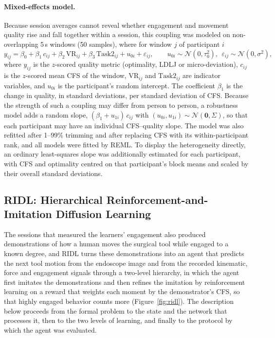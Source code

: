 \documentclass[utf8]{frontiers_suppmat}
\begin{document}
\paragraph*{Mixed-effects model.} Because session averages cannot reveal whether engagement and movement quality rise and fall together within a session, this coupling was modeled on non-overlapping 5\,s windows (50 samples), where for window $j$ of participant $i$
\begin{equation}\label{eq:lmm}
y_{ij}=\beta_0+\beta_1\,c_{ij}+\beta_2\,\mathrm{VR}_{ij}+\beta_3\,\mathrm{Task2}_{ij}+u_{0i}+\varepsilon_{ij},\qquad u_{0i}\sim\mathcal N(0,\tau_0^2),\ \ \varepsilon_{ij}\sim\mathcal N(0,\sigma^2),
\end{equation}
where $y_{ij}$ is the $z$-scored quality metric (optimality, LDLJ or micro-deviation), $c_{ij}$ is the $z$-scored mean CFS of the window, $\mathrm{VR}_{ij}$ and $\mathrm{Task2}_{ij}$ are indicator variables, and $u_{0i}$ is the participant's random intercept. The coefficient $\beta_1$ is the change in quality, in standard deviations, per standard deviation of CFS. Because the strength of such a coupling may differ from person to person, a robustness model adds a random slope, $(\beta_1+u_{1i})\,c_{ij}$ with $(u_{0i},u_{1i})\sim\mathcal N(\mathbf 0,\Sigma)$, so that each participant may have an individual CFS--quality slope. The model was also refitted after 1--99\% trimming and after replacing CFS with its within-participant rank, and all models were fitted by REML. To display the heterogeneity directly, an ordinary least-squares slope was additionally estimated for each participant, with CFS and optimality centred on that participant's block means and scaled by their overall standard deviations.

\subsection{RIDL: Hierarchical Reinforcement-and-Imitation Diffusion Learning}
The sessions that measured the learners' engagement also produced demonstrations of how a human moves the surgical tool while engaged to a known degree, and RIDL turns these demonstrations into an agent that predicts the next tool motion from the endoscope image and from the recorded kinematic, force and engagement signals through a two-level hierarchy, in which the agent first imitates the demonstrations and then refines the imitation by reinforcement learning on a reward that weights each moment by the demonstrator's CFS, so that highly engaged behavior counts more (Figure~\ref{fig:ridl}). The description below proceeds from the formal problem to the state and the network that processes it, then to the two levels of learning, and finally to the protocol by which the agent was evaluated.
\end{document}
